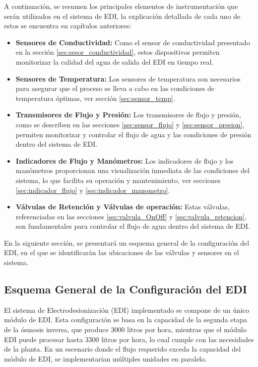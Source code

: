 A continuación, se resumen los principales elementos de instrumentación que serán utilizados en el sistema de EDI, la explicación detallada de cada uno de estos se encuentra en capítulos anteriores:
\begin{itemize}
    \item \textbf{Sensores de Conductividad:} Como el sensor de conductividad presentado en la sección \ref{sec:sesor_conductividad}, estos dispositivos permiten monitorizar la calidad del agua de salida del EDI en tiempo real.

    \item \textbf{Sensores de Temperatura:} Los sensores de temperatura son necesarios para asegurar que el proceso se lleva a cabo en las condiciones de temperatura óptimas, ver sección \ref{sec:sensor_temp}.

    \item \textbf{Transmisores de Flujo y Presión:} Los transmisores de flujo y presión, como se describen en las secciones \ref{sec:sensor_flujo} y \ref{sec:sensor_presion}, permiten monitorizar y controlar el flujo de agua y las condiciones de presión dentro del sistema de EDI.

    \item \textbf{Indicadores de Flujo y Manómetros:} Los indicadores de flujo y los manómetros proporcionan una visualización inmediata de las condiciones del sistema, lo que facilita su operación y mantenimiento, ver secciones \ref{sec:indicador_flujo} y \ref{sec:indicador_manometro}.

    \item \textbf{Válvulas de Retención y Válvulas de operación:} Estas válvulas, referenciadas en las secciones \ref{sec:valvula_OnOff} y \ref{sec:valvula_retencion}, son fundamentales para controlar el flujo de agua dentro del sistema de EDI.
\end{itemize}
En la siguiente sección, se presentará un esquema general de la configuración del EDI, en el que se identificarán las ubicaciones de las válvulas y sensores en el sistema.

\subsection{Esquema General de la Configuración del EDI}

El sistema de Electrodesionización (EDI) implementado se compone de un único módulo de EDI.
Esta configuración se basa en la capacidad de la segunda etapa de la ósmosis inversa, que
produce 3000 litros por hora, mientras que el módulo EDI puede procesar hasta 3300 litros por hora,
lo cual cumple con las necesidades de la planta. En un escenario donde el flujo requerido exceda la
capacidad del módulo de EDI, se implementarían múltiples unidades en paralelo.

